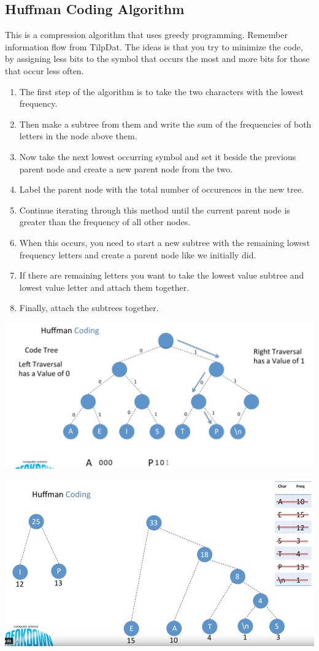 \subsection{Huffman Coding Algorithm}

This is a compression algorithm that uses greedy programming. Remember information flow from TilpDat. 
The ideas is that you try to minimize the code, by assigning less bits to the symbol that occurs the most and more bits for those that occur less often. 

\begin{enumerate}
    \item The first step of the algorithm is to take the two characters with the lowest frequency.
    \item Then make a subtree from them and write the sum of the frequencies of both letters in the node above them.
    \item Now take the next lowest occurring symbol and set it beside the previous parent node and create a new parent node from the two. 
    \item Label the parent node with the total number of occurences in the new tree.
    \item Continue iterating through this method until the current parent node is greater than the frequency of all other nodes. 
    \item When this occurs, you need to start a new subtree with the remaining lowest frequency letters and create a parent node like we initially did.
    \item If there are remaining letters you want to take the lowest value subtree and lowest value letter and attach them together. 
    \item Finally, attach the subtrees together.
\end{enumerate}

\includegraphics[width=\textwidth]{images/NonHuffman.png}

\includegraphics[width=\textwidth]{images/Huffman.png}